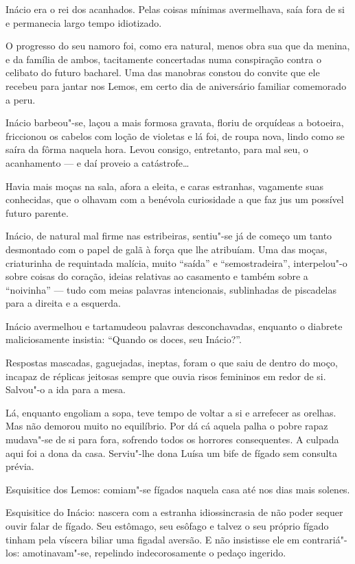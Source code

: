 Inácio era o rei dos acanhados. Pelas coisas mínimas avermelhava, saía
fora de si e permanecia largo tempo idiotizado.

O progresso do seu namoro foi, como era natural, menos obra sua que da
menina, e da família de ambos, tacitamente concertadas numa conspiração
contra o celibato do futuro bacharel. Uma das manobras constou do
convite que ele recebeu para jantar nos Lemos, em certo dia de
aniversário familiar comemorado a peru.

Inácio barbeou"-se, laçou a mais formosa gravata, floriu de orquídeas a
botoeira, friccionou os cabelos com loção de violetas e lá foi, de roupa
nova, lindo como se saíra da fôrma naquela hora. Levou consigo,
entretanto, para mal seu, o acanhamento --- e daí proveio a
catástrofe\ldots{}

Havia mais moças na sala, afora a eleita, e caras estranhas, vagamente
suas conhecidas, que o olhavam com a benévola curiosidade a que faz jus
um possível futuro parente.

Inácio, de natural mal firme nas estribeiras, sentiu"-se já de começo um
tanto desmontado com o papel de galã à força que lhe atribuíam. Uma das
moças, criaturinha de requintada malícia, muito ``saída'' e
``semostradeira'', interpelou"-o sobre coisas do coração, ideias
relativas ao casamento e também sobre a ``noivinha'' --- tudo com meias
palavras intencionais, sublinhadas de piscadelas para a direita e a
esquerda.

Inácio avermelhou e tartamudeou palavras desconchavadas, enquanto o
diabrete maliciosamente insistia: ``Quando os doces, seu Inácio?''.

Respostas mascadas, gaguejadas, ineptas, foram o que saiu de dentro do
moço, incapaz de réplicas jeitosas sempre que ouvia risos femininos em
redor de si. Salvou"-o a ida para a mesa.

Lá, enquanto engoliam a sopa, teve tempo de voltar a si e arrefecer as
orelhas. Mas não demorou muito no equilíbrio. Por dá cá aquela palha o
pobre rapaz mudava"-se de si para fora, sofrendo todos os horrores
consequentes. A culpada aqui foi a dona da casa. Serviu"-lhe dona Luísa
um bife de fígado sem consulta prévia.

Esquisitice dos Lemos: comiam"-se fígados naquela casa até nos dias mais
solenes.

Esquisitice do Inácio: nascera com a estranha idiossincrasia de não
poder sequer ouvir falar de fígado. Seu estômago, seu esôfago e talvez o
seu próprio fígado tinham pela víscera biliar uma figadal aversão. E não
insistisse ele em contrariá"-los: amotinavam"-se, repelindo
indecorosamente o pedaço ingerido.

